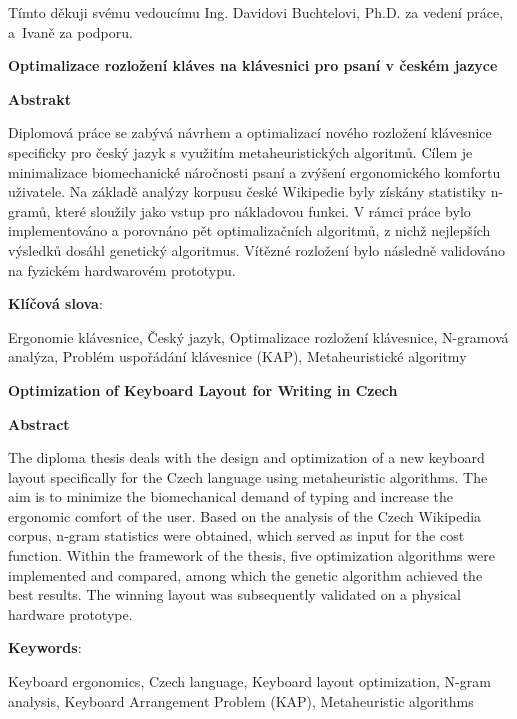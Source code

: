 \documentclass[a4paper, twoside, 12pt, czech]{article}
\begin{document}
Tímto děkuji svému vedoucímu Ing. Davidovi Buchtelovi, Ph.D. za vedení práce, 
a~Ivaně za podporu.

\newpage
\noindent\Large\textbf{Optimalizace rozložení kláves na klávesnici pro psaní v českém jazyce}

\vspace{1cm}
\normalsize
\noindent\textbf{Abstrakt}

Diplomová práce se zabývá návrhem a optimalizací nového rozložení kláves\-nice 
specificky pro český jazyk s využitím metaheuristických algoritmů. Cílem je 
minimalizace biomechanické náročnosti psaní a zvýšení ergonomického komfortu 
uživatele. Na základě analýzy korpusu české Wikipedie byly získány statistiky 
n-gramů, které sloužily jako vstup pro nákladovou funkci. V rámci práce bylo 
implementováno a porovnáno pět optimalizačních algoritmů, z nichž nejlepších 
výsledků dosáhl genetický algoritmus. Vítězné rozložení bylo následně validováno 
na fyzickém hardwarovém prototypu.

\vspace{0.5cm}
\noindent\textbf{Klíčová slova}: 

Ergonomie klávesnice, Český jazyk, Optimalizace rozložení klávesnice, N-gramová 
analýza, Problém uspořádání klávesnice (KAP), Metaheuristické algoritmy 

\newpage
\noindent\Large\textbf{Optimization of Keyboard Layout for Writing in Czech}

\vspace{1cm}
\normalsize
\noindent\textbf{Abstract}

The diploma thesis deals with the design and optimization of a new keyboard 
layout specifically for the Czech language using metaheuristic algorithms. 
The aim is to minimize the biomechanical demand of typing and increase the 
ergonomic comfort of the user. Based on the analysis of the Czech Wikipedia 
corpus, n-gram statistics were obtained, which served as input for the cost 
function. Within the framework of the thesis, five optimization algorithms were 
implemented and compared, among which the genetic algorithm achieved the best 
results. The winning layout was subsequently validated on a physical hardware 
prototype.

\vspace{0.5cm}
\noindent\textbf{Keywords}: 

Keyboard ergonomics, Czech language, Keyboard layout optimization, N-gram analysis,
Keyboard Arrangement Problem (KAP), Metaheuristic algorithms
\newpage
\tableofcontents
\newpage
\end{document}
